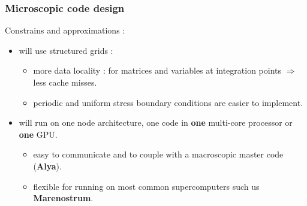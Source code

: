 \documentclass[usenames,dvipsnames]{beamer}
\begin{document}
\begin{frame}
\frametitle{Microscopic code design}

\textcolor{OliveGreen}{Constrains and approximations} :
\begin{itemize}
  \item will use structured grids :
  \begin{itemize}
   \item more data locality : for matrices and variables at integration points $\Rightarrow$ less cache misses.
   \item periodic and uniform stress boundary conditions are easier to implement.
  \end{itemize}
  \item will run on one node architecture, one code in \textbf{one} multi-core processor or \textbf{one} GPU.
  \begin{itemize}
   \item easy to communicate and to couple with a macroscopic master code (\textbf{Alya}).
   \item flexible for running on most common supercomputers such us \textbf{Marenostrum}.
  \end{itemize}

\end{itemize}

\begin{figure}[!ht]
\end{figure}

\end{frame}
\end{document}
